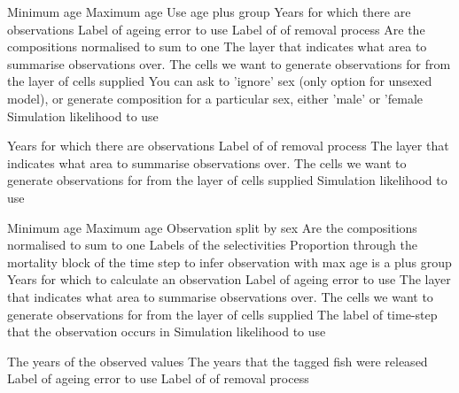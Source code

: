  {Minimum age}
 {Maximum age}
 {Use age plus group}
 {Years for which there are observations}
 {Label of ageing error to use}
 {Label of of removal process}
 {Are the compositions normalised to sum to one}
 {The layer that indicates what area to summarise observations over.}
 {The cells we want to generate observations for from the layer of cells supplied}
 {You can ask to 'ignore' sex (only option for unsexed model), or generate composition for a particular sex, either 'male' or 'female}
 {Simulation likelihood to use}
\par\textbf{}\par
{} {Years for which there are observations}
 {Label of of removal process}
 {The layer that indicates what area to summarise observations over.}
 {The cells we want to generate observations for from the layer of cells supplied}
 {Simulation likelihood to use}
\par\textbf{}\par
{} {Minimum age}
 {Maximum age}
 {Observation split by sex}
 {Are the compositions normalised to sum to one}
 {Labels of the selectivities}
 {Proportion through the mortality block of the time step to infer observation with}
 {max age is a plus group}
 {Years for which to calculate an observation}
 {Label of ageing error to use}
 {The layer that indicates what area to summarise observations over.}
 {The cells we want to generate observations for from the layer of cells supplied}
 {The label of time-step that the observation occurs in}
 {Simulation likelihood to use}
\par\textbf{}\par
{} {The years of the observed values}
 {The years that the tagged fish were released}
 {Label of ageing error to use}
 {Label of of removal process}
